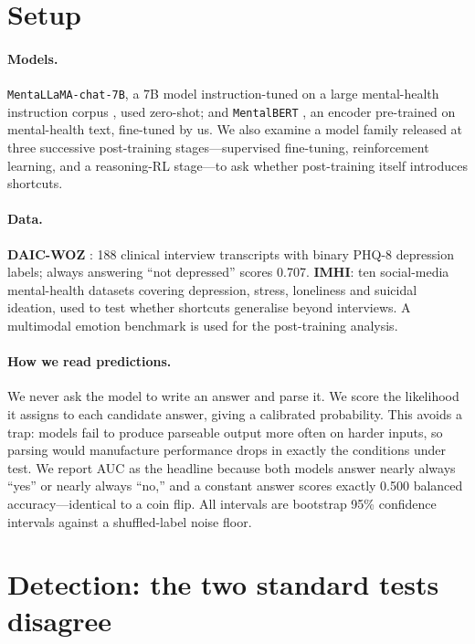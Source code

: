 \documentclass{article}
\begin{document}
\section{Setup}

\paragraph{Models.} \texttt{MentaLLaMA-chat-7B}, a 7B model instruction-tuned on
a large mental-health instruction corpus
\citep{yang2024mentallama}, used zero-shot; and
\texttt{MentalBERT} \citep{ji2022mentalbert}, an
encoder pre-trained on mental-health text, fine-tuned by us. We also examine a
model family released at three successive post-training stages---supervised
fine-tuning, reinforcement learning, and a reasoning-RL stage---to ask whether
post-training itself introduces shortcuts.

\paragraph{Data.} \textbf{DAIC-WOZ} \citep{gratch2014daic}:
188 clinical interview transcripts with binary PHQ-8 depression labels; always
answering ``not depressed'' scores 0.707. \textbf{IMHI}: ten social-media
mental-health datasets covering depression, stress, loneliness and suicidal
ideation, used to test whether shortcuts generalise beyond interviews. A
multimodal emotion benchmark is used for the post-training analysis.

\paragraph{How we read predictions.} We never ask the model to write an answer
and parse it. We score the likelihood it assigns to each candidate answer,
giving a calibrated probability. This avoids a trap: models fail to produce
parseable output more often on harder inputs, so parsing would manufacture
performance drops in exactly the conditions under test. We report AUC as the
headline because both models answer nearly always ``yes'' or nearly always
``no,'' and a constant answer scores exactly 0.500 balanced accuracy---identical
to a coin flip. All intervals are bootstrap 95\% confidence intervals against a
shuffled-label noise floor.

\section{Detection: the two standard tests disagree}
\label{sec:detect}
\end{document}
